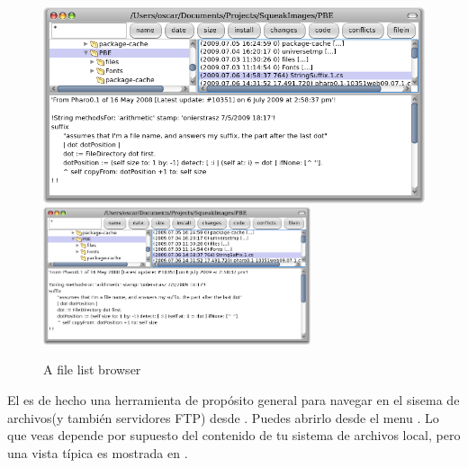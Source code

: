 \documentclass[spanish,a4paper,10pt,twoside]{book}
\begin{document}
\begin{figure}[btp]
	\begin{center}
	\ifluluelse
		{\includegraphics[width=\textwidth]{fileList}}
		{\includegraphics[width=0.7\textwidth]{fileList}}
	\end{center}
	\caption{A file list browser}
\end{figure}

El  es de hecho una herramienta de
prop\'osito general para navegar en el sisema de archivos(y tambi\'en servidores
FTP) desde \pharo. Puedes abrirlo desde el menu . Lo que veas depende por supuesto del contenido de tu sistema
de archivos local, pero una vista t\'ipica es mostrada en .
\end{document}
